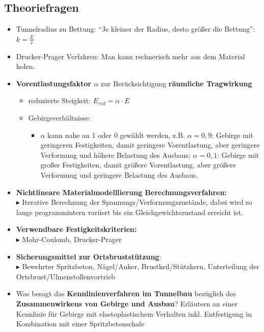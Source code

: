 \documentclass[fleqn,twoside]{article}
\begin{document}
\subsection{Theoriefragen}
\begin{small}
\begin{itemize}
    \item Tunnelradius zu Bettung: \enquote{Je kleiner der Radius, desto größer die Bettung}: $k = \frac{E}{r}$
    \item Drucker-Prager Verfahren: Man kann rechnerisch mehr aus dem Material holen.
    \item \textbf{Vorentlastungsfaktor $\alpha$} zur Berücksichtigung \textbf{räumliche Tragwirkung}
        \begin{itemize}
            \item reduzierte Steigkeit: $E_{red} = \alpha \cdot E$
            \item Gebirgsverhältnisse:
                \begin{itemize}
                    \item $\alpha$ kann nahe an 1 oder 0 gewählt werden, z.B. $\alpha = 0,9$: Gebirge mit geringeren Festigkeiten, damit geringere Vorentlastung, aber geringere Verformung und höhere Belastung des Ausbaus; $\alpha = 0,1$: Gebirge mit großer Festigkeiten, damit größere Vorentlastung, aber größere Verformung und geringere Belastung des Ausbaus.
                \end{itemize}
        \end{itemize}
    \item \textbf{Nichtlineare Materialmodelllierung Berechnungsverfahren:}\\
    $\blacktriangleright$ Iterative Berechnung der Spannungs/Verformungszustände, dabei wird so lange programmintern variiert bis ein Gleichgewichtszustand erreicht ist.
    \item \textbf{Verwendbare Festigkeitskriterien:}\\
    $\blacktriangleright$ Mohr-Coulomb, Drucker-Prager
    \item \textbf{Sicherungsmittel zur Ortsbruststützung}:\\
    $\blacktriangleright$ Bewehrter Spritzbeton, Nägel/Anker, Brustkeil/Stützkern, Unterteilung der Ortsbrust/Ulmenstollenvortrieb
    \item Was besagt das \textbf{Kennlinienverfahren im Tunnelbau} bezüglich des \textbf{Zusammenwirkens von Gebirge und Ausbau}? Erläutern an einer Kennlinie für Gebirge mit elastoplastischem Verhalten inkl. Entfestigung in Kombination mit einer Spritzbetonschale\\

\end{itemize}
\end{small}
\end{document}
